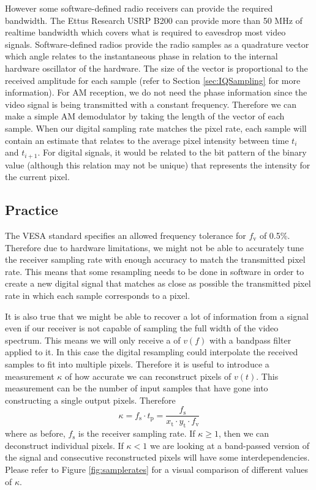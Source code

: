 \documentclass[a4paper,12pt,twoside,openright]{report}
\begin{document}
However some software-defined radio receivers can provide the required bandwidth. The Ettus Research USRP B200 can provide more than 50 MHz of realtime bandwidth which covers what is required to eavesdrop most video signals. Software-defined radios provide the radio samples as a quadrature vector which angle relates to the instantaneous phase in relation to the internal hardware oscillator of the hardware. The size of the vector is proportional to the received amplitude for each sample (refer to Section \ref{sec:IQSampling} for more information). For AM reception, we do not need the phase information since the video signal is being transmitted with a constant frequency. Therefore we can make a simple AM demodulator by taking the length of the vector of each sample. When our digital sampling rate matches the pixel rate, each sample will contain an estimate that relates to the average pixel intensity between time $t_{i}$ and $t_{i+1}$. For digital signals, it would be related to the bit pattern of the binary value (although this relation may not be unique) that represents the intensity for the current pixel.

\subsection{Practice}
The VESA standard specifies an allowed frequency tolerance for $f_\text{v}$ of 0.5\%. Therefore due to hardware limitations, we might not be able to accurately tune the receiver sampling rate with enough accuracy to match the transmitted pixel rate. This means that some resampling needs to be done in software in order to create a new digital signal that matches as close as possible the transmitted pixel rate in which each sample corresponds to a pixel.

It is also true that we might be able to recover a lot of information from a signal even if our receiver is not capable of sampling the full width of the video spectrum. This means we will only receive a of $v(f)$ with a bandpass filter applied to it. In this case the digital resampling could interpolate the received samples to fit into multiple pixels. Therefore it is useful to introduce a measurement $\kappa$ of how accurate we can reconstruct pixels of $v(t)$. This measurement can be the number of input samples that have gone into constructing a single output pixels. Therefore
\begin{equation}
\label{eq:kappa}
\kappa = f_\text{s} \cdot t_\text{p} = \frac{f_\text{s}}{x_\text{t} \cdot y_\text{t} \cdot f_\text{v}}
\end{equation}
where as before, $f_\text{s}$ is the receiver sampling rate. If $\kappa \geq 1$, then we can deconstruct individual pixels. If $\kappa < 1$ we are looking at a band-passed version of the signal and consecutive reconstructed pixels will have some interdependencies. Please refer to Figure \ref{fig:samplerates} for a visual comparison of different values of $\kappa$.
\end{document}
